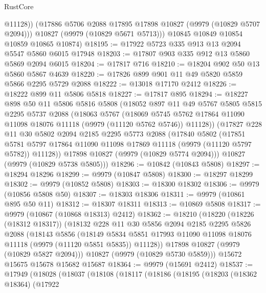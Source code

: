 \begin{lexlean}{RustCore}
\begin{coremodule}
            @11128))
        (@17886 @5706 @2088 @17895 @17898 @10827 (@9979 (@10829 @5707 @2094)))
        @10827
        (@9979 (@10829 @5671 @5713)))
      @10845
      @10849
      @10854
      @10859
      @10865
      @10874)
@18195 := @17922 @5723 @335 @913 @13 @2094 @5547 @5860 @6015 @17948
@18203 := @17807 @903 @335 @912 @13 @5860 @5869 @2094 @6015
@18204 := @17817 @716
@18210 := @18204 @902 @50 @13 @5860 @5867 @4639
@18220 := @17826 @899 @901 @11 @49 @5820 @5859 @5866 @2295 @5729 @2088
@18222 := @13018 @17170 @2412
@18226 := @18222 @899 @11 @5806 @5818
@18227 := @17817 @895
@18294 := @18227
    @898
    @50
    @11
    @5806
    @5816
    @5808
    (@18052
      @897
      @11
      @49
      @5767
      @5805
      @5815
      @2295
      @5737
      @2088
      (@18063
        @5767
        (@18069 @5745 @5762 @17864 @11090 @11098 @18076 @11118 (@9979 (@11120 @5762 @5746)) @11128))
      (@17827
        @228
        @11
        @30
        @5802
        @2094
        @2185
        @2295
        @5773
        @2088
        (@17840
          @5802
          (@17851
            @5781
            @5797
            @17864
            @11090
            @11098
            @17869
            @11118
            (@9979 (@11120 @5797 @5782))
            @11128))
        @17898
        @10827
        (@9979 (@10829 @5774 @2094)))
      @10827
      (@9979 (@10829 @5738 @5805)))
@18296 := @10842 (@10843 @5808)
@18297 := @18294 @18296
@18299 := @9979 (@10847 @5808)
@18300 := @18297 @18299
@18302 := @9979 (@10852 @5808)
@18303 := @18300 @18302
@18306 := @9979 (@10856 @5808 @50)
@18307 := @18303 @18306
@18311 := @9979 (@10861 @895 @50 @11)
@18312 := @18307 @18311
@18313 := @10869 @5808
@18317 := @9979 (@10867 (@10868 @18313) @2412)
@18362 := @18210
    (@18220
      (@18226 (@18312 @18317))
      (@18132
        @228
        @11
        @30
        @5856
        @2094
        @2185
        @2295
        @5826
        @2088
        (@18143
          @5856
          (@18149
            @5834
            @5851
            @17993
            @11090
            @11098
            @18076
            @11118
            (@9979 (@11120 @5851 @5835))
            @11128))
        @17898
        @10827
        (@9979 (@10829 @5827 @2094)))
      @10827
      (@9979 (@10829 @5730 @5859)))
    @15672
    @15675
    @15678
    @15682
    @15687
@18364 := @9979 (@15691 @2412)
@18537 := @17949
    (@18028
      (@18037
        (@18108
          (@18117
            (@18186
              (@18195
                (@18203
                  (@18362 @18364)
                  (@17922

\end{coremodule}
\end{lexlean}
